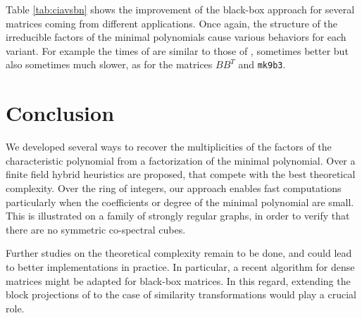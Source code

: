 \documentclass{article}
\begin{document}
Table \ref{tab:ciavsbn} shows the improvement of the black-box approach for
several matrices coming from
different applications. Once again, the structure of the irreducible factors of
the minimal polynomials cause various behaviors for each variant. For example
the times of \dlogsys\xspace are similar to those of 
\nullcomb, sometimes better but also sometimes much slower, as
for the matrices $BB^T$ and \texttt{mk9b3}.

\section{Conclusion}
We developed several ways to recover the multiplicities of the factors of the 
characteristic polynomial  from a factorization of the minimal
polynomial. 
Over a finite field  hybrid heuristics are proposed, that compete with
the best theoretical complexity.
Over the ring of integers, our approach enables fast
computations particularly when the coefficients or degree of the minimal
polynomial are small.
This is illustrated on a family of strongly regular graphs, in order to verify
 that there are no symmetric co-spectral cubes.

Further studies on the theoretical complexity remain to be done, and could lead
to better implementations in practice. In particular, a recent algorithm for
dense matrices \cite{Pernet:2007:charp} might be adapted for black-box
matrices. 
In this regard, extending the block projections of
\cite{EGGSV:2007:BBinv} to the case of similarity transformations would play a
crucial role.
\end{document}
